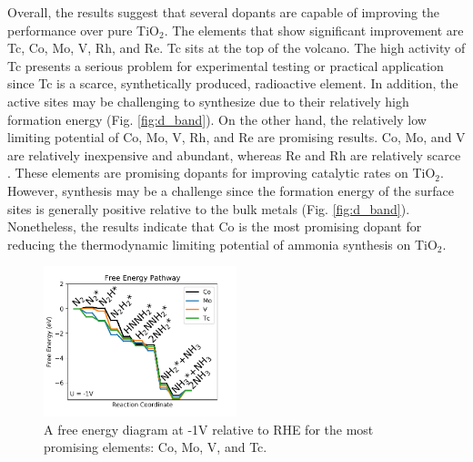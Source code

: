 
Overall, the results suggest that several dopants are capable of improving the performance over pure TiO$_2$. The elements that show significant improvement are Tc, Co, Mo, V, Rh, and Re. Tc sits at the top of the volcano. The high activity of Tc presents a serious problem for experimental testing or practical application since Tc is a scarce, synthetically produced, radioactive element. In addition, the active sites may be challenging to synthesize due to their relatively high formation energy (Fig. \ref{fig:d_band}). On the other hand, the relatively low limiting potential of Co, Mo, V, Rh, and Re are promising results. Co, Mo, and V are relatively inexpensive and abundant, whereas Re and Rh are relatively scarce \cite{Vesborg_2012}. These elements are promising dopants for improving catalytic rates on TiO$_2$. However, synthesis may be a challenge since the formation energy of the surface sites is generally positive relative to the bulk metals (Fig. \ref{fig:d_band}). Nonetheless, the results indicate that Co is the most promising dopant for reducing the thermodynamic limiting potential of ammonia synthesis on TiO$_2$.

\begin{figure}
    \centering
    \includegraphics[width=0.5\textwidth]{Images/fed.pdf}
    \caption{A free energy diagram at -1V relative to RHE for the most promising elements: Co, Mo, V, and Tc.}
    \label{fig:FED}
\end{figure}




